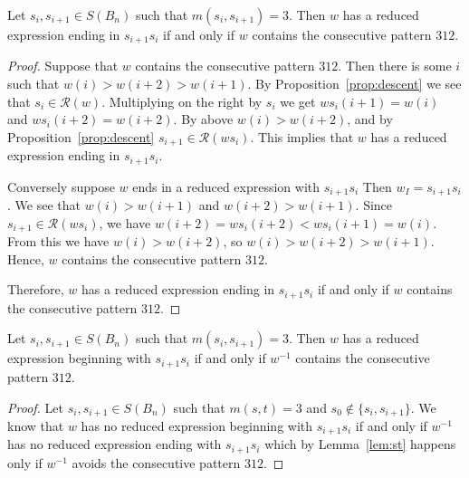 \begin{lemma}\label{lem:st}
Let $s_i,s_{i+1} \in S(B_n)$ such that $m(s_i,s_{i+1})=3$. Then $w$ has a reduced expression ending in $s_{i+1}s_i$ if and only if $w$ contains the consecutive pattern $312$.
\begin{proof}
	Suppose that $w$ contains the consecutive pattern $312$.  Then there is some $i$ such that $w(i)>w(i+2)>w(i+1)$. By Proposition~\ref{prop:descent} we see that $s_i \in \mathcal{R}(w)$. Multiplying on the right by $s_i$ we get $ws_i(i+1)=w(i)$ and $ws_i(i+2)=w(i+2)$. By above $w(i)>w(i+2)$, and by Proposition~\ref{prop:descent} $s_{i+1} \in \mathcal{R}(ws_i)$. This implies that $w$ has a reduced expression ending in $s_{i+1}s_i$. 
	
	Conversely suppose $w$ ends in a reduced expression with $s_{i+1}s_i$ Then $w_I=s_{i+1}s_i$. We see that $w(i)>w(i+1)$ and $w(i+2)>w(i+1)$. Since $s_{i+1} \in \mathcal{R}(ws_i)$, we have $w(i+2)=ws_i(i+2)<ws_i(i+1)=w(i)$. From this we have $w(i)>w(i+2)$, so $w(i)>w(i+2)>w(i+1)$. Hence, $w$ contains the consecutive pattern $312$. 
	
	Therefore, $w$ has a reduced expression ending in $s_{i+1}s_i$ if and only if $w$ contains the consecutive pattern $312$.
\end{proof}
\end{lemma}

\begin{corollary}\label{lem:endswithts}
	Let $s_i,s_{i+1} \in S(B_n)$ such that $m(s_i,s_{i+1})=3$. Then $w$ has a reduced expression beginning with $s_{i+1}s_i$ if and only if $w^{-1}$ contains the consecutive pattern $312$.
	\begin{proof}
		Let $s_i,s_{i+1} \in S(B_n)$ such that $m(s,t)=3$ and $s_0 \notin\{s_i,s_{i+1}\}$. We know that $w$ has no reduced expression beginning with $s_{i+1}s_i$ if and only if $w^{-1}$ has no reduced expression ending with $s_{i+1}s_i$ which by Lemma~\ref{lem:st} happens only if $w^{-1}$ avoids the consecutive pattern $312.$
	\end{proof}
\end{corollary}


